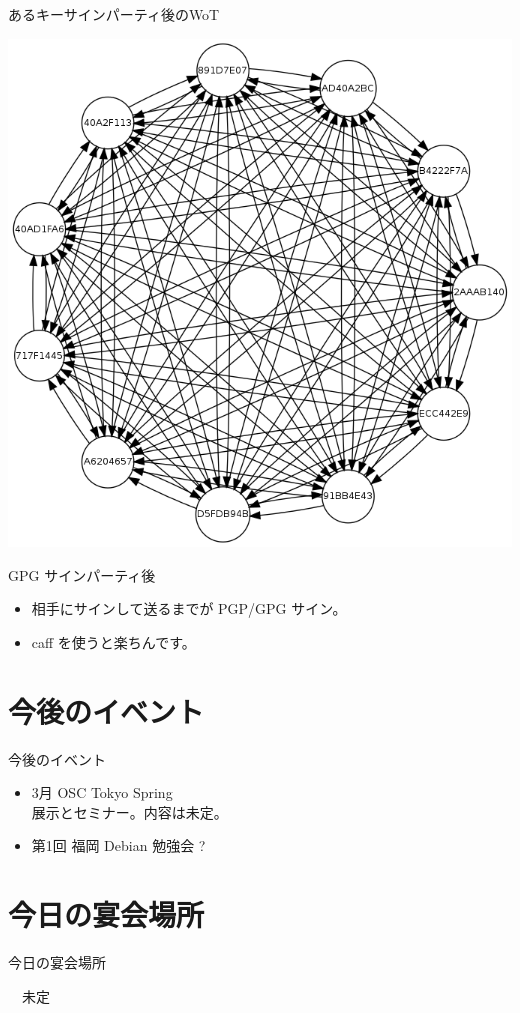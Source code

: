 \begin{frame}{あるキーサインパーティ後のWoT}
\begin{center}
\includegraphics[width=0.7\hsize]{image201111/kof2011-ksp0.png}
\end{center}
\end{frame}

\begin{frame}{GPG サインパーティ後}

\begin{itemize}
\item 相手にサインして送るまでが PGP/GPG サイン。
\item caff を使うと楽ちんです。
\end{itemize}

\end{frame}



\section{今後のイベント}
\begin{frame}{今後のイベント}
 
\begin{itemize}
 \item 3月 OSC Tokyo Spring\\
  展示とセミナー。内容は未定。
 \item 第1回 福岡 Debian 勉強会 ?
\end{itemize}
\end{frame}

\section{今日の宴会場所}
\begin{frame}{今日の宴会場所}

\begin{center}
　{\Large 未定}
\end{center}
\end{frame}



